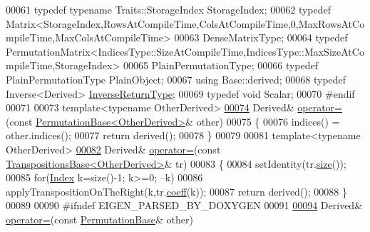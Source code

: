 \begin{DoxyCode}
00061     \textcolor{keyword}{typedef} \textcolor{keyword}{typename} Traits::StorageIndex StorageIndex;
00062     \textcolor{keyword}{typedef} 
      Matrix<StorageIndex,RowsAtCompileTime,ColsAtCompileTime,0,MaxRowsAtCompileTime,MaxColsAtCompileTime>
00063             DenseMatrixType;
00064     \textcolor{keyword}{typedef} 
      PermutationMatrix<IndicesType::SizeAtCompileTime,IndicesType::MaxSizeAtCompileTime,StorageIndex>
00065             PlainPermutationType;
00066     \textcolor{keyword}{typedef} PlainPermutationType PlainObject;
00067     \textcolor{keyword}{using} Base::derived;
00068     \textcolor{keyword}{typedef} Inverse<Derived> \hyperlink{group___core___module_class_eigen_1_1_cwise_unary_op}{InverseReturnType};
00069     \textcolor{keyword}{typedef} \textcolor{keywordtype}{void} Scalar;
00070 \textcolor{preprocessor}{    #endif}
00071 
00073     \textcolor{keyword}{template}<\textcolor{keyword}{typename} OtherDerived>
\hyperlink{group___core___module_a8e15540549c5a4e2d5b3b426fef8fbcf}{00074}     Derived& \hyperlink{group___core___module_a8e15540549c5a4e2d5b3b426fef8fbcf}{operator=}(\textcolor{keyword}{const} \hyperlink{group___core___module_class_eigen_1_1_permutation_base}{PermutationBase<OtherDerived>}& other)
00075     \{
00076       indices() = other.indices();
00077       \textcolor{keywordflow}{return} derived();
00078     \}
00079 
00081     \textcolor{keyword}{template}<\textcolor{keyword}{typename} OtherDerived>
\hyperlink{group___core___module_acaa7cce9ea62c811cec12e86dbb2f0de}{00082}     Derived& \hyperlink{group___core___module_acaa7cce9ea62c811cec12e86dbb2f0de}{operator=}(\textcolor{keyword}{const} \hyperlink{class_eigen_1_1_transpositions_base}{TranspositionsBase<OtherDerived>}& tr)
00083     \{
00084       setIdentity(tr.\hyperlink{class_eigen_1_1_transpositions_base_a6888d6261a9cc24ee8607496e610a5a3}{size}());
00085       \textcolor{keywordflow}{for}(\hyperlink{group___core___module_a554f30542cc2316add4b1ea0a492ff02}{Index} k=size()-1; k>=0; --k)
00086         applyTranspositionOnTheRight(k,tr.\hyperlink{class_eigen_1_1_transpositions_base_aae1d3847b107e518c9f2b6010a6b635a}{coeff}(k));
00087       \textcolor{keywordflow}{return} derived();
00088     \}
00089 
00090 \textcolor{preprocessor}{    #ifndef EIGEN\_PARSED\_BY\_DOXYGEN}
00091 
\hyperlink{group___core___module_ac0e84abc954c5427469bb5e7a4717b46}{00094}     Derived& \hyperlink{group___core___module_ac0e84abc954c5427469bb5e7a4717b46}{operator=}(\textcolor{keyword}{const} \hyperlink{group___core___module_class_eigen_1_1_permutation_base}{PermutationBase}& other)

\end{DoxyCode}
